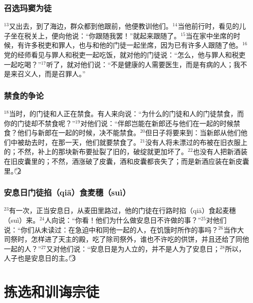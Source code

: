 \subsubsection{召选玛窦为徒}
$^{13}$\UL[耶稣]又出去，到了海边，群众都到他跟前，他便教训他们。$^{14}$当他前行时，看见\UL[阿耳斐]的儿子\UL[肋未]坐在税关上，便向他说：“你跟随我罢！”\UL[肋未]就起来跟随了\UL[耶稣]。$^{15}$当\UL[耶稣]在\UL[肋未]家中坐席的时候，有许多税吏和罪人，也与\UL[耶稣]和他的门徒一起坐席，因为已有许多人跟随了他。$^{16}$\UL[法利塞]党的经师看见\UL[耶稣]与罪人和税吏一起吃饭，就对他的门徒说：“怎么，他与罪人和税吏一起吃喝？”$^{17}$\UL[耶稣]听了，就对他们说：“不是健康的人需要医生，而是有病的人；我不是来召义人，而是召罪人。”


\subsubsection{禁食的争论}
$^{18}$当时，\UL[若翰]的门徒和\UL[法利塞]人正在禁食。有人来向\UL[耶稣]说：“为什么\UL[若翰]的门徒和\UL[法利塞]人的门徒禁食，而你的门徒却不禁食呢？”$^{19}$\UL[耶稣]对他们说：“伴郎岂能在新郎还与他们在一起的时候禁食？他们与新郎在一起的时候，决不能禁食。$^{20}$但日子将要来到：当新郎从他们他们中被劫去时，在那一天，他们就要禁食了。$^{21}$没有人将未漂过的布被在旧衣服上的；不然，补上的那块新布要扯裂了旧的，破绽就更加坏了。$^{22}$也没有人把新酒装在旧皮囊里的；不然，酒涨破了皮囊，酒和皮囊都丧失了；而是新酒应装在新皮囊里。”\textcircled{2}


\subsubsection{安息日门徒掐（qiā）食麦穗（suì）}
$^{23}$有一次，正当安息日，\UL[耶稣]从麦田里路过，他的门徒在行路时掐（qiā）食起麦穗（suì）来。$^{24}$\UL[法利塞]人向\UL[耶稣]说：“你看！他们为什么做安息日不许做的事？”$^{25}$\UL[耶稣]对他们说：“你们从未读过：\UL[达味]在急迫中和同他一起的人，在饥饿时所作的事吗？$^{26}$当\UL[厄贝雅塔尔]作大司祭时，\UL[达味]怎样进了天主的殿，吃了除司祭外，谁也不许吃的供饼，并且还给了同他一起的人？”$^{27}$\UL[耶稣]又对他们说：“安息日是为人立的，并不是人为了安息日；$^{28}$所以，人子也是安息日的主。”\textcircled{3}


\section{拣选和训诲宗徒}



